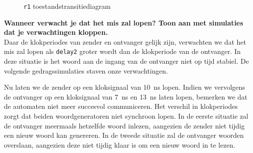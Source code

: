 \documentclass[titlepage]{article}
\begin{document}
\begin{figure}[h!]
    \centering

    \caption{\texttt{r1} toestandstransitiediagram}
    \label{fig:r1_toestandstransitiediagram}
\end{figure}

\noindent \textbf{Wanneer verwacht je dat het mis zal lopen? Toon aan met simulaties dat je verwachtingen kloppen.} \\
Daar de klokperiodes van zender en ontvanger gelijk zijn,
verwachten we dat het mis zal lopen als \texttt{delay2} groter wordt dan de klokperiode van de ontvanger.
In deze situatie is het woord aan de ingang van de ontvanger niet op tijd stabiel.
De volgende gedragssimulaties staven onze verwachtingen.

Nu laten we de zender op een kloksignaal van \SI{10}{\nano\second} lopen.
Indien we vervolgens de ontvanger op een kloksignaal van \SI{7}{\nano\second} en \SI{13}{\nano\second} laten lopen,
bemerken we dat de automaten niet meer succesvol communiceren.
Het verschil in klokperiodes zorgt dat beiden woordgeneratoren niet synchroon lopen.
In de eerste situatie zal de ontvanger meermaals hetzelfde woord inlezen, aangezien de zender niet tijdig een nieuw woord kan genereren.
In de tweede situatie zal de ontvanger woorden overslaan, aangezien deze niet tijdig klaar is om een nieuw woord in te lezen.
\end{document}
